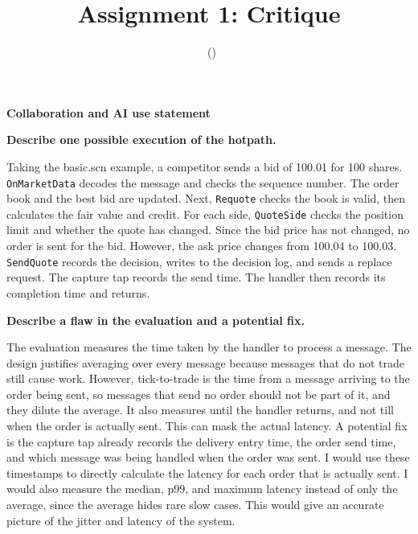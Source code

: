 \documentclass[11pt]{article}
\title{Assignment 1: Critique}
\author{\studentname\ (\netid)}
\date{}
\newcommand{\prompt}[1]{\par\medskip\noindent\textbf{#1}\par\smallskip\noindent\ignorespaces}
\begin{document}
\maketitle

\begin{center}
  \textbf{Collaboration and AI use statement}
\end{center}
\noindent{}

\clearpage

\prompt{Describe one possible execution of the hotpath.}
Taking the basic.scn example, a competitor sends a bid of 100.01 for 100 shares. \texttt{OnMarketData} decodes the message and checks the sequence number. The order book and the best bid are updated. Next, \texttt{Requote} checks the book is valid, then calculates the fair value and credit. For each side, \texttt{QuoteSide} checks the position limit and whether the quote has changed. Since the bid price has not changed, no order is sent for the bid. However, the ask price changes from 100.04 to 100.03. \texttt{SendQuote} records the decision, writes to the decision log, and sends a replace request. The capture tap records the send time. The handler then records its completion time and returns.

\prompt{Describe a flaw in the evaluation and a potential fix.}

The evaluation measures the time taken by the handler to process a message. The design justifies averaging over every message because messages that do not trade still cause work. However, tick-to-trade is the time from a message arriving to the order being sent, so messages that send no order should not be part of it, and they dilute the average. It also measures until the handler returns, and not till when the order is actually sent. This can mask the actual latency. A potential fix is the capture tap already records the delivery entry time, the order send time, and which message was being handled when the order was sent. I would use these timestamps to directly calculate the latency for each order that is actually sent. I would also measure the median, p99, and maximum latency instead of only the average, since the average hides rare slow cases. This would give an accurate picture of the jitter and latency of the system.
\end{document}
